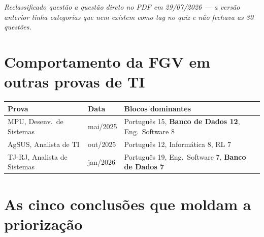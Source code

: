 \textit{Reclassificado questão a questão direto no PDF em 29/07/2026 --- a
versão anterior tinha categorias que nem existem como tag no quiz e não
fechava as 30 questões.}

\section{Comportamento da FGV em outras provas de TI}

\begin{center}
\begin{tabular}{@{}p{3.2cm}p{2cm}p{5.6cm}@{}}
\toprule
\textbf{Prova} & \textbf{Data} & \textbf{Blocos dominantes} \\
\midrule
MPU, Desenv.\ de Sistemas & mai/2025 & Português 15, \textbf{Banco de Dados 12}, Eng.\ Software 8 \\
AgSUS, Analista de TI & out/2025 & Português 12, Informática 8, RL 7 \\
TJ-RJ, Analista de Sistemas & jan/2026 & Português 19, Eng.\ Software 7, \textbf{Banco de Dados 7} \\
\bottomrule
\end{tabular}
\end{center}

\section{As cinco conclusões que moldam a priorização}

